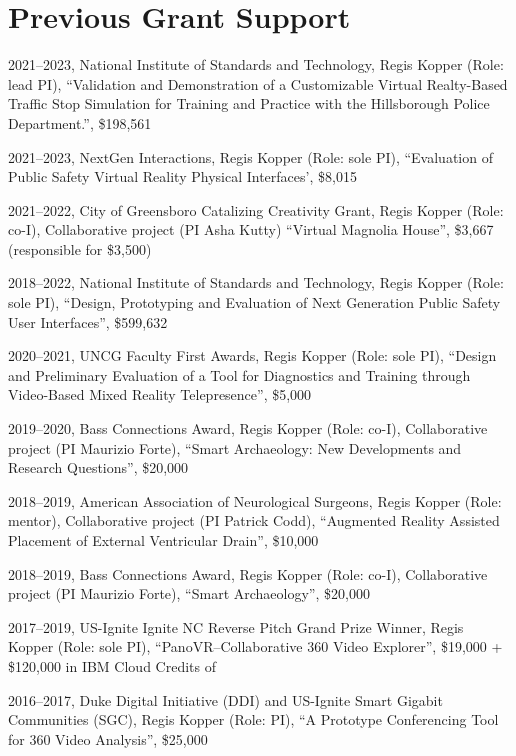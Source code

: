 \documentclass[wideaddress]{vitae}
\begin{document}
\section{Previous Grant Support}
\begin{etaremune}
	\item{2021--2023, National Institute of Standards and Technology, Regis Kopper (Role: lead PI), ``Validation and Demonstration of a Customizable Virtual Realty-Based Traffic Stop Simulation for Training and Practice with the Hillsborough Police Department.'', \$198,561}
	\item{2021--2023, NextGen Interactions, Regis Kopper (Role: sole PI), ``Evaluation of Public Safety Virtual Reality Physical Interfaces', \$8,015}
	\item{2021--2022, City of Greensboro Catalizing Creativity Grant, Regis Kopper (Role: co-I), Collaborative project (PI Asha Kutty) ``Virtual Magnolia House'', \$3,667 (responsible for \$3,500)}
	\item{2018--2022, National Institute of Standards and Technology, Regis Kopper (Role: sole PI), ``Design, Prototyping and Evaluation of Next Generation Public Safety User Interfaces'', \$599,632}
	\item{2020--2021, UNCG Faculty First Awards, Regis Kopper (Role: sole PI), ``Design and Preliminary Evaluation of a Tool for Diagnostics and Training through Video-Based Mixed Reality Telepresence'', \$5,000}
	\item{2019--2020, Bass Connections Award, Regis Kopper (Role: co-I), Collaborative project (PI Maurizio Forte), ``Smart Archaeology: New Developments and Research Questions'', \$20,000}
	\item{2018--2019, American Association of Neurological Surgeons, Regis Kopper (Role: mentor), Collaborative project (PI Patrick Codd), ``Augmented Reality Assisted Placement of External Ventricular Drain'', \$10,000}
	\item{2018--2019, Bass Connections Award, Regis Kopper (Role: co-I), Collaborative project (PI Maurizio Forte), ``Smart Archaeology'', \$20,000}
	\item{2017--2019, US-Ignite Ignite NC Reverse Pitch Grand Prize Winner, Regis Kopper (Role: sole PI), ``PanoVR--Collaborative 360\textdegree{} Video Explorer'', \$19,000 + \$120,000 in IBM Cloud Credits}
of 	\item{2016--2017, Duke Digital Initiative (DDI) and US-Ignite Smart Gigabit Communities (SGC), Regis Kopper (Role: PI), ``A Prototype Conferencing Tool for 360\textdegree{} Video Analysis'', \$25,000}

\end{etaremune}
\end{document}
